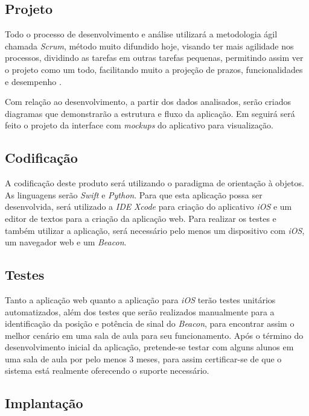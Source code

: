 \documentclass[
	12pt,
	oneside,
	a4paper,
	english,
	brazil,
]{abntex2}
\begin{document}
\subsection{Projeto}

Todo o processo de desenvolvimento e análise utilizará a metodologia ágil chamada \emph{Scrum}, método muito difundido hoje, visando ter mais agilidade nos processos, dividindo as tarefas em outras tarefas pequenas, permitindo assim ver o projeto como um todo, facilitando muito a projeção de prazos, funcionalidades e desempenho \cite{scrum}.

Com relação ao desenvolvimento, a partir dos dados analisados, serão criados diagramas que demonstrarão a estrutura e fluxo da aplicação. Em seguirá será feito o projeto da interface com \emph{mockups} do aplicativo para visualização.

\subsection{Codificação}

A codificação deste produto será utilizando o paradigma de orientação à objetos. As linguagens serão \emph{Swift} e \emph{Python}. Para que esta aplicação possa ser desenvolvida, será utilizado a \emph{IDE} \emph{Xcode} para criação do aplicativo \emph{iOS} e um editor de textos para a criação da aplicação web. Para realizar os testes e também utilizar a aplicação, será necessário pelo menos um dispositivo com \emph{iOS}, um navegador web e um \emph{Beacon}.

\subsection{Testes}

Tanto a aplicação web quanto a aplicação para \emph{iOS} terão testes unitários automatizados, além dos testes que serão realizados manualmente para a identificação da posição e potência de sinal do \emph{Beacon}, para encontrar assim o melhor cenário em uma sala de aula para seu funcionamento. Após o término do desenvolvimento inicial da aplicação, pretende-se testar com alguns alunos em uma sala de aula por pelo menos 3 meses, para assim certificar-se de que o sistema está realmente oferecendo o suporte necessário.

\subsection{Implantação}
\end{document}
